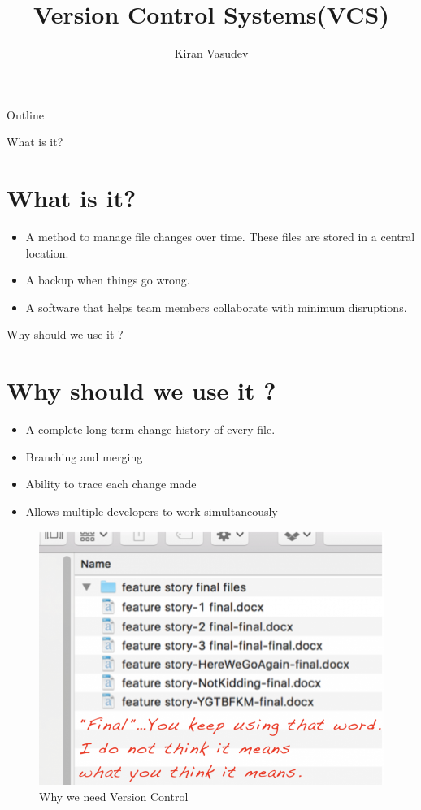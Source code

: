 \documentclass{beamer}
\title{Version Control Systems(VCS)}
\author{Kiran Vasudev\inst{1}}
\institute[]
{
  \inst{1}
  Hochschule Bonn-Rhein-Sieg

}
\begin{document}
\begin{frame}
  \titlepage
\end{frame}

\begin{frame}{Outline}
  \tableofcontents
\end{frame}

\begin{frame}{What is it?}
\section{What is it?}
  \begin{itemize}
  \item {
    A method to manage file changes over time. These files are stored in a central location.
  }
  \item {
    A backup when things go wrong.
  }
  \item{A software that helps team members collaborate with minimum disruptions.}
  \end{itemize}
\end{frame}

\begin{frame}{Why should we use it ?}
\section{Why should we use it ?}
  \begin{itemize}
  \item {
    A complete long-term change history of every file.
  }
  \item {   
    Branching and merging
  }
  \item {   
    Ability to trace each change made
  }
  \item {   
	Allows multiple developers to work simultaneously
  }
  \end{itemize}
\begin{figure}
	\includegraphics[scale=0.25]{images/final-final}
	\caption{Why we need Version Control\cite{naming-conv}}
\end{figure}
\end{frame}
\end{document}
